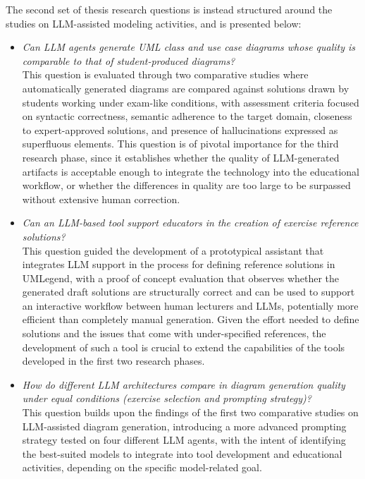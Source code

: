 The second set of thesis research questions is instead structured around the studies on LLM-assisted modeling activities, and is presented below:

\begin{itemize}
    \item[\textbf{TRQ4:}] \textit{Can LLM agents generate UML class and use case diagrams whose quality is comparable to that of student-produced diagrams?}\\
    This question is evaluated through two comparative studies where automatically generated diagrams are compared against solutions drawn by students working under exam-like conditions, with assessment criteria focused on syntactic correctness, semantic adherence to the target domain, closeness to expert-approved solutions, and presence of hallucinations expressed as superfluous elements. This question is of pivotal importance for the third research phase, since it establishes whether the quality of LLM-generated artifacts is acceptable enough to integrate the technology into the educational workflow, or whether the differences in quality are too large to be surpassed without extensive human correction.
    \item[\textbf{TRQ5:}] \textit{Can an LLM-based tool support educators in the creation of exercise reference solutions?}\\
    This question guided the development of a prototypical assistant that integrates LLM support in the process for defining reference solutions in UMLegend, with a proof of concept evaluation that observes whether the generated draft solutions are structurally correct and can be used to support an interactive workflow between human lecturers and LLMs, potentially more efficient than completely manual generation. Given the effort needed to define solutions and the issues that come with under-specified references, the development of such a tool is crucial to extend the capabilities of the tools developed in the first two research phases.
    \item[\textbf{TRQ6:}] \textit{How do different LLM architectures compare in diagram generation quality under equal conditions (exercise selection and prompting strategy)?}\\
    This question builds upon the findings of the first two comparative studies on LLM-assisted diagram generation, introducing a more advanced prompting strategy tested on four different LLM agents, with the intent of identifying the best-suited models to integrate into tool development and educational activities, depending on the specific model-related goal.
\end{itemize}

